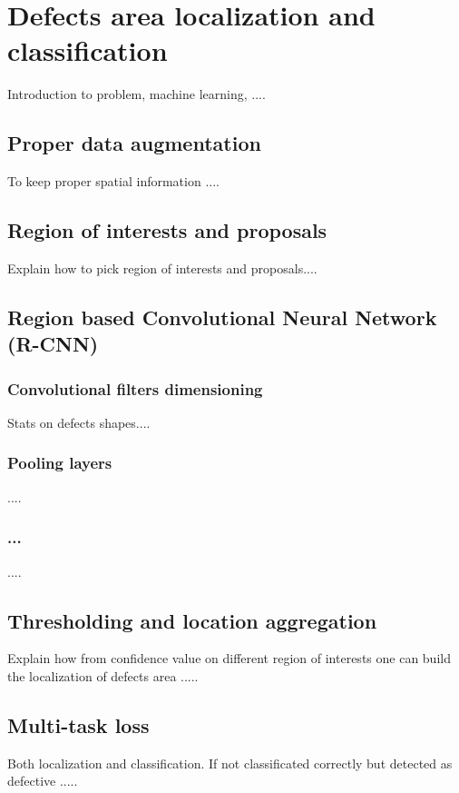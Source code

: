 \section{Defects area localization and classification}
    Introduction to problem, machine learning, ....

    \subsection{Proper data augmentation}
        To keep proper spatial information ....

    \subsection{Region of interests and proposals}
        Explain how to pick region of interests and proposals....

    \subsection{Region based Convolutional Neural Network (R-CNN)}
        \subsubsection{Convolutional filters dimensioning}
            Stats on defects shapes....
        \subsubsection{Pooling layers}
            ....
        \subsubsection{...}
            ....
    
    \subsection{Thresholding and location aggregation}
        Explain how from confidence value on different region of interests one can build the localization of defects area .....

    \subsection{Multi-task loss}
    Both localization and classification. If not classificated correctly but detected as defective .....